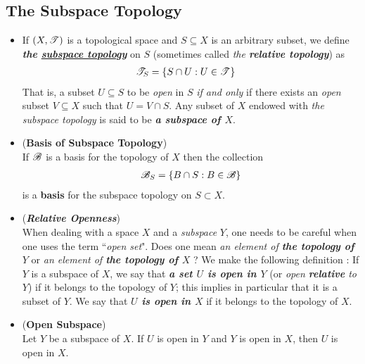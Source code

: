 \documentclass[11pt]{article}
\begin{document}
\subsection{The Subspace Topology}
\begin{itemize}
\item \begin{definition}
If $(X, {\mathscr T})$ is a topological space and $S \subseteq X$ is an arbitrary subset, we define \emph{\textbf{the \underline{subspace topology}}} on $S$ (sometimes called \emph{the \textbf{relative topology}}) as
\begin{align*}
{\mathscr T}_{S} &= \left\{S\cap U: U \in {\mathscr T}\right\}
\end{align*} 
That is, a subset $U \subseteq S$ to be \emph{open} in $S$ \emph{if and only} if there exists an \emph{open} subset $V \subseteq X$ such that $U = V \cap S$.  Any subset of $X$ endowed with \emph{the subspace topology} is said to be \emph{\textbf{a subspace of $X$}}.
\end{definition}

\item \begin{lemma} (\textbf{Basis of Subspace Topology})\\
If ${\mathscr B}$ is a basis for the topology of $X$ then the collection
\begin{align*}
{\mathscr B}_{S} = \left\{B \cap S:  B \in {\mathscr B}\right\}
\end{align*}
is a \textbf{basis}  for the subspace topology on $S \subset X$.
\end{lemma}

\item \begin{remark} (\emph{\textbf{Relative Openness}})\\
When dealing with a space $X$ and a \emph{subspace} $Y$, one needs to be careful when one uses the term ``\emph{open set}". Does one mean \emph{an element of \textbf{the topology of $Y$}} or \emph{an element of \textbf{the topology of $X$}} ? We make the following definition : If $Y$ is a subspace of $X$, we say that \emph{\textbf{a set $U$ is open in $Y$}} (or \emph{open \textbf{relative} to $Y$}) if it belongs to the topology of $Y$; this implies in particular that it is a subset of $Y$. We say that \emph{\textbf{$U$ is open in $X$}} if it belongs to the topology of $X$.
\end{remark}

\item \begin{lemma} (\textbf{Open Subspace})\\
Let $Y$ be a subspace of $X$. If $U$ is open in $Y$ and $Y$ is open in $X$, then $U$ is open in $X$.
\end{lemma}


\end{itemize}
\end{document}
